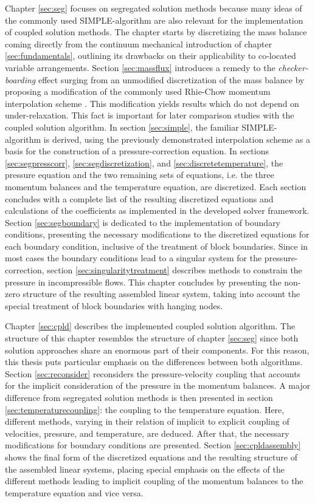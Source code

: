 Chapter \ref{sec:seg} focuses on segregated solution methods because many ideas of the commonly used SIMPLE-algorithm are also relevant for the implementation of coupled solution methods. The chapter starts by discretizing the mass balance coming directly from the continuum mechanical introduction of chapter \ref{sec:fundamentals}, outlining its drawbacks on their applicability to co-located variable arrangements. Section \ref{sec:massflux} introduces a remedy to the \emph{checker-boarding} effect surging from an unmodified discretization of the mass balance by proposing a modification of the commonly used Rhie-Chow momentum interpolation scheme \cite{rhie82}. This modification yields results which do not depend on under-relaxation. This fact is important for later comparison studies with the coupled solution algorithm. In section \ref{sec:simple}, the familiar SIMPLE-algorithm is derived, using the previously demonstrated interpolation scheme as a basis for the construction of a pressure-correction equation. In sections \ref{sec:segpresscorr}, \ref{sec:segdiscretization}, and \ref{sec:discretetemperature}, the pressure equation and the two remaining sets of equations, i.e. the three momentum balances and the temperature equation, are discretized. Each section concludes with a complete list of the resulting discretized equations and calculations of the coefficients as implemented in the developed solver framework. Section \ref{sec:segboundary} is dedicated to the implementation of boundary conditions, presenting the necessary modifications to the discretized equations for each boundary condition, inclusive of the treatment of block boundaries. Since in most cases the boundary conditions lead to a singular system for the pressure-correction, section \ref{sec:singularitytreatment} describes methods to constrain the pressure in incompressible flows. This chapter concludes by presenting the non-zero structure of the resulting assembled linear system, taking into account the special treatment of block boundaries with hanging nodes.

Chapter \ref{sec:cpld} describes the implemented coupled solution algorithm. The structure of this chapter resembles the structure of chapter \ref{sec:seg} since both solution approaches share an enormous part of their components. For this reason, this thesis puts particular emphasis on the differences between both algorithms. Section \ref{sec:reconsider} reconsiders the pressure-velocity coupling that accounts for the implicit consideration of the pressure in the momentum balances. A major difference from segregated solution methods is then presented in section \ref{sec:temperaturecoupling}: the coupling to the temperature equation. Here, different methods, varying in their relation of implicit to explicit coupling of velocities, pressure, and temperature, are deduced. After that, the necessary modifications for boundary conditions are presented. Section \ref{sec:cpldassembly} shows the final form of the discretized equations and the resulting structure of the assembled linear systems, placing special emphasis on the effects of the different methods leading to implicit coupling of the momentum balances to the temperature equation and vice versa.

